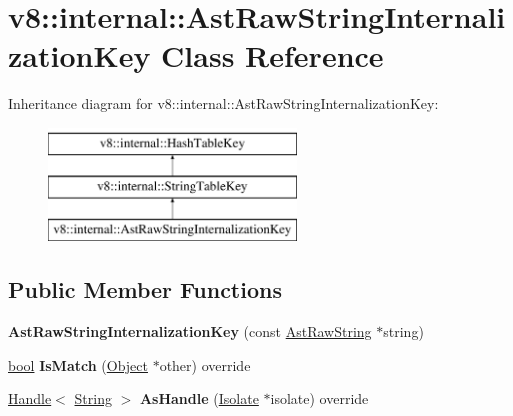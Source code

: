 \hypertarget{classv8_1_1internal_1_1AstRawStringInternalizationKey}{}\section{v8\+:\+:internal\+:\+:Ast\+Raw\+String\+Internalization\+Key Class Reference}
\label{classv8_1_1internal_1_1AstRawStringInternalizationKey}
Inheritance diagram for v8\+:\+:internal\+:\+:Ast\+Raw\+String\+Internalization\+Key\+:\begin{figure}[H]
\begin{center}
\leavevmode
\includegraphics[height=3.000000cm]{classv8_1_1internal_1_1AstRawStringInternalizationKey}
\end{center}
\end{figure}
\subsection*{Public Member Functions}
\begin{DoxyCompactItemize}
\item 
\mbox{\label{classv8_1_1internal_1_1AstRawStringInternalizationKey_af3086b894b997d1556f3501bcca631e1}} 
{\bfseries Ast\+Raw\+String\+Internalization\+Key} (const \mbox{\hyperlink{classv8_1_1internal_1_1AstRawString}{Ast\+Raw\+String}} $\ast$string)
\item 
\mbox{\label{classv8_1_1internal_1_1AstRawStringInternalizationKey_a1c607363298ca68d533fd3dfa8fb21f5}} 
\mbox{\hyperlink{classbool}{bool}} {\bfseries Is\+Match} (\mbox{\hyperlink{classv8_1_1internal_1_1Object}{Object}} $\ast$other) override
\item 
\mbox{\label{classv8_1_1internal_1_1AstRawStringInternalizationKey_a5651450f3939cfd58337be1ad0489694}} 
\mbox{\hyperlink{classv8_1_1internal_1_1Handle}{Handle}}$<$ \mbox{\hyperlink{classv8_1_1internal_1_1String}{String}} $>$ {\bfseries As\+Handle} (\mbox{\hyperlink{classv8_1_1internal_1_1Isolate}{Isolate}} $\ast$isolate) override
\end{DoxyCompactItemize}
